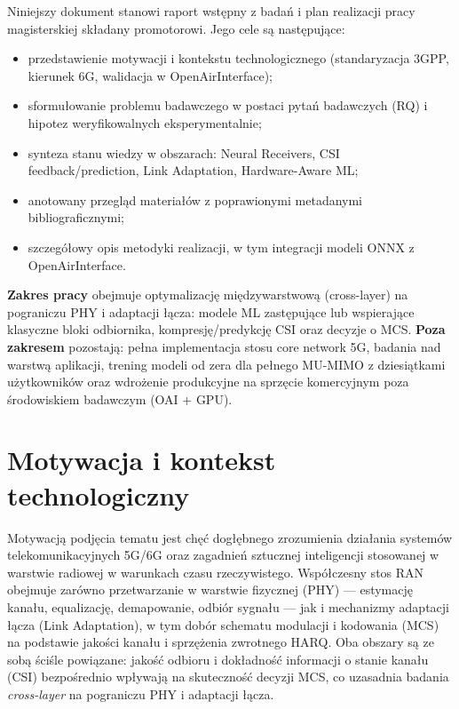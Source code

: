 \documentclass[12pt, a4paper]{article}
\begin{document}
Niniejszy dokument stanowi raport wstępny z badań i plan realizacji pracy magisterskiej składany promotorowi. Jego cele są następujące:
\begin{itemize}[leftmargin=*]
    \item przedstawienie motywacji i kontekstu technologicznego (standaryzacja 3GPP, kierunek 6G, walidacja w OpenAirInterface);
    \item sformułowanie problemu badawczego w postaci pytań badawczych (RQ) i hipotez weryfikowalnych eksperymentalnie;
    \item synteza stanu wiedzy w obszarach: Neural Receivers, CSI feedback/prediction, Link Adaptation, Hardware-Aware ML;
    \item anotowany przegląd materiałów z poprawionymi metadanymi bibliograficznymi;
    \item szczegółowy opis metodyki realizacji, w tym integracji modeli ONNX z OpenAirInterface.
\end{itemize}

\textbf{Zakres pracy} obejmuje optymalizację międzywarstwową (cross-layer) na pograniczu PHY i adaptacji łącza: modele ML zastępujące lub wspierające klasyczne bloki odbiornika, kompresję/predykcję CSI oraz decyzje o MCS. \textbf{Poza zakresem} pozostają: pełna implementacja stosu core network 5G, badania nad warstwą aplikacji, trening modeli od zera dla pełnego MU-MIMO z dziesiątkami użytkowników oraz wdrożenie produkcyjne na sprzęcie komercyjnym poza środowiskiem badawczym (OAI + GPU).

\section{Motywacja i kontekst technologiczny}

Motywacją podjęcia tematu jest chęć dogłębnego zrozumienia działania systemów telekomunikacyjnych 5G/6G oraz zagadnień sztucznej inteligencji stosowanej w warstwie radiowej w warunkach czasu rzeczywistego. Współczesny stos RAN obejmuje zarówno przetwarzanie w warstwie fizycznej (PHY) --- estymację kanału, equalizację, demapowanie, odbiór sygnału --- jak i mechanizmy adaptacji łącza (Link Adaptation), w tym dobór schematu modulacji i kodowania (MCS) na podstawie jakości kanału i sprzężenia zwrotnego HARQ. Oba obszary są ze sobą ściśle powiązane: jakość odbioru i dokładność informacji o stanie kanału (CSI) bezpośrednio wpływają na skuteczność decyzji MCS, co uzasadnia badania \emph{cross-layer} na pograniczu PHY i adaptacji łącza.
\end{document}

